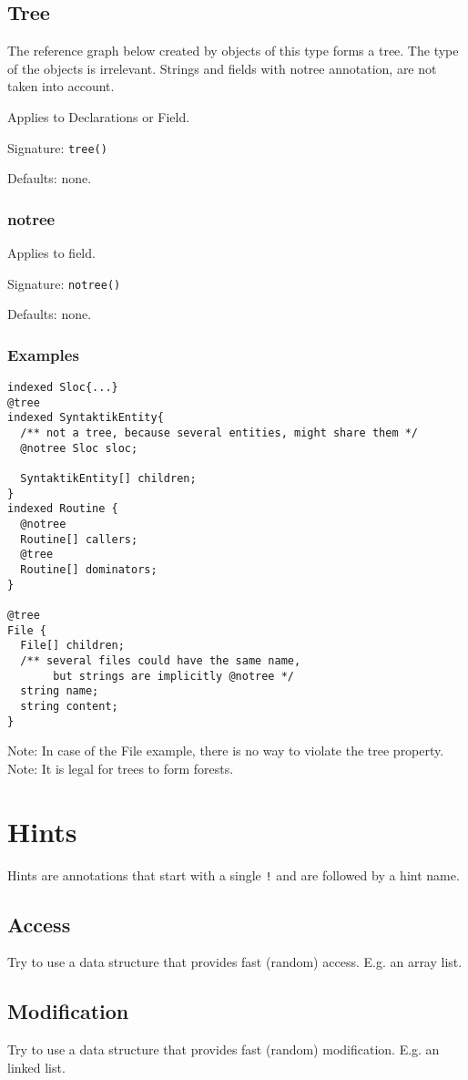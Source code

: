 \documentclass[a4paper,10pt]{article}
\begin{document}
\subsection*{Tree}
The reference graph below created by objects of this type forms a tree. The type of the objects is irrelevant. Strings and fields with notree annotation, are not taken into account.

Applies to Declarations or Field.

Signature: \verb/tree()/

Defaults: none.


\subsubsection*{notree}
Applies to field.

Signature: \verb/notree()/

Defaults: none.

\subsubsection*{Examples}
\begin{verbatim}
indexed Sloc{...}
@tree
indexed SyntaktikEntity{
  /** not a tree, because several entities, might share them */
  @notree Sloc sloc;
  
  SyntaktikEntity[] children;
}
indexed Routine {
  @notree
  Routine[] callers;
  @tree
  Routine[] dominators;
}

@tree
File {
  File[] children;
  /** several files could have the same name,
       but strings are implicitly @notree */
  string name;
  string content;
} 
\end{verbatim}
Note: In case of the File example, there is no way to violate the tree property.
Note: It is legal for trees to form forests.


\section{Hints}
\label{hints}

Hints are annotations that start with a single \verb/!/ and are followed by a hint name.

\subsection*{Access}
Try to use a data structure that provides fast (random) access. E.g. an array list.

\subsection*{Modification}
Try to use a data structure that provides fast (random) modification. E.g. an linked list.
\end{document}
